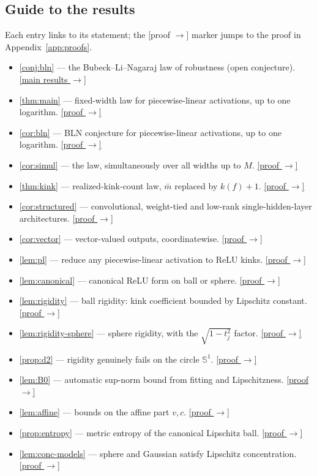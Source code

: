 \documentclass[11pt,reqno]{amsart}
\theoremstyle{plain}
\theoremstyle{definition}
\theoremstyle{remark}
\newcommand{\proofbutton}[1]{\hyperref[proof:#1]{\textnormal{\footnotesize\textsf{[proof $\to$]}}}}
\begin{document}
\subsection{Guide to the results}
Each entry links to its statement; the \textsf{[proof $\to$]} marker jumps to the proof in Appendix~\ref{app:proofs}.
\begin{itemize}
\item \ref{conj:bln} --- the Bubeck--Li--Nagaraj law of robustness (open conjecture). \hyperref[thm:main]{[main results $\to$]}
\item \ref{thm:main} --- fixed-width law for piecewise-linear activations, up to one logarithm. \proofbutton{main}
\item \ref{cor:bln} --- BLN conjecture for piecewise-linear activations, up to one logarithm. \proofbutton{bln}
\item \ref{cor:simul} --- the law, simultaneously over all widths up to $M$. \proofbutton{simul}
\item \ref{thm:kink} --- realized-kink-count law, $\bar m$ replaced by $k(f)+1$. \proofbutton{kink}
\item \ref{cor:structured} --- convolutional, weight-tied and low-rank single-hidden-layer architectures. \proofbutton{structured}
\item \ref{cor:vector} --- vector-valued outputs, coordinatewise. \proofbutton{vector}
\item \ref{lem:pl} --- reduce any piecewise-linear activation to ReLU kinks. \proofbutton{pl}
\item \ref{lem:canonical} --- canonical ReLU form on ball or sphere. \proofbutton{canonical}
\item \ref{lem:rigidity} --- ball rigidity: kink coefficient bounded by Lipschitz constant. \proofbutton{rigidity}
\item \ref{lem:rigidity-sphere} --- sphere rigidity, with the $\sqrt{1-t_j^2}$ factor. \proofbutton{rigidity-sphere}
\item \ref{prop:d2} --- rigidity genuinely fails on the circle $\mathbb S^1$. \proofbutton{d2}
\item \ref{lem:B0} --- automatic sup-norm bound from fitting and Lipschitzness. \proofbutton{B0}
\item \ref{lem:affine} --- bounds on the affine part $v,c$. \proofbutton{affine}
\item \ref{prop:entropy} --- metric entropy of the canonical Lipschitz ball. \proofbutton{entropy}
\item \ref{lem:conc-models} --- sphere and Gaussian satisfy Lipschitz concentration. \proofbutton{conc-models}

\end{itemize}
\end{document}
